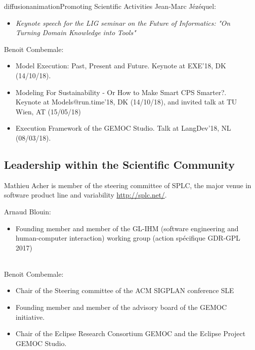\documentclass{ra2018}
\begin{document}
\begin{module}{diffusion}{animation}{Promoting Scientific Activities}
Jean-Marc J\'ez\'equel:
\begin{itemize}
	\item \emph{Keynote speech for the LIG seminar on the Future of Informatics: "On  Turning Domain Knowledge into Tools"}
\end{itemize}

Benoit Combemale: 
\begin{itemize}
	\item Model Execution: Past, Present and Future. Keynote at EXE’18, DK (14/10/18).
	\item Modeling For Sustainability - Or How to Make Smart CPS Smarter?. Keynote at Models@run.time’18, DK (14/10/18), and invited talk at TU Wien, AT (15/05/18)
	\item Execution Framework of the GEMOC Studio. Talk at LangDev’18, NL (08/03/18).
\end{itemize}


\subsection{Leadership within the Scientific Community}

Mathieu Acher is member of the steering committee of SPLC, the major venue in software product line and variability \url{http://splc.net/}.

\noindent Arnaud Blouin:
\begin{itemize}
	\item Founding member and member of the GL-IHM (software engineering and human-computer interaction) working group (action spécifique GDR-GPL 2017)
\end{itemize}


~\\
Benoit Combemale:
\begin{itemize}
	\item Chair of the Steering committee of the ACM SIGPLAN conference SLE
	\item Founding member and member of the advisory board of the GEMOC initiative. 
	\item Chair of the Eclipse Research Consortium GEMOC and the Eclipse Project GEMOC Studio. 
\end{itemize}







\end{module}
\end{document}
